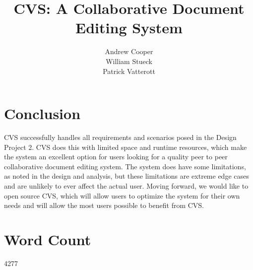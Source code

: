 \documentclass{6033dp1/6033dp1}
\title{CVS: A Collaborative Document Editing System}
\author{Andrew Cooper\\ William Stueck\\ Patrick Vatterott}
\begin{document}
\maketitle















\section{Conclusion}

CVS successfully handles all requirements and scenarios posed in the Design Project 2.  CVS does this with limited space and runtime resources, which make the system an excellent option for users looking for a quality peer to peer collaborative document editing system.  The system does have some limitations, as noted in the design and analysis, but these limitations are extreme edge cases and are unlikely to ever affect the actual user.  Moving forward, we would like to open source CVS, which will allow users to optimize the system for their own needs and will allow the most users possible to benefit from CVS.

\section{Word Count}
4277
\end{document}

